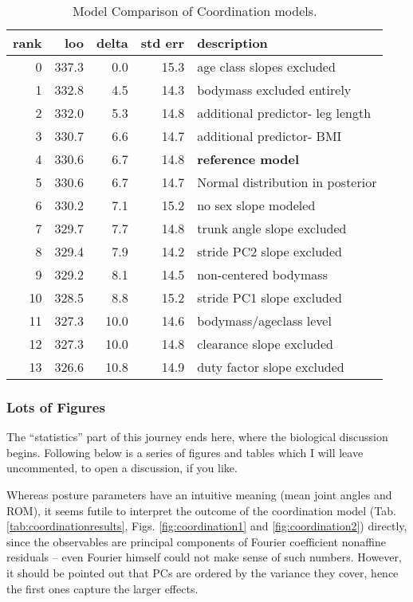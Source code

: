 \begin{table}[htbp]
\caption{\label{tab:coordinationmodelcomparison}Model Comparison of Coordination models.}
\centering
\begin{tabular}{rrrrl}
\textbf{rank} & \textbf{loo} & \textbf{delta} & \textbf{std err} & \textbf{description}\\[0pt]
\hline
0 & 337.3 & 0.0 & 15.3 & age class slopes excluded\\[0pt]
1 & 332.8 & 4.5 & 14.3 & bodymass excluded entirely\\[0pt]
2 & 332.0 & 5.3 & 14.8 & additional predictor- leg length\\[0pt]
3 & 330.7 & 6.6 & 14.7 & additional predictor- BMI\\[0pt]
4 & 330.6 & 6.7 & 14.8 & \textbf{reference model}\\[0pt]
5 & 330.6 & 6.7 & 14.7 & Normal distribution in posterior\\[0pt]
6 & 330.2 & 7.1 & 15.2 & no sex slope modeled\\[0pt]
7 & 329.7 & 7.7 & 14.8 & trunk angle slope excluded\\[0pt]
8 & 329.4 & 7.9 & 14.2 & stride PC2 slope excluded\\[0pt]
9 & 329.2 & 8.1 & 14.5 & non-centered bodymass\\[0pt]
10 & 328.5 & 8.8 & 15.2 & stride PC1 slope excluded\\[0pt]
11 & 327.3 & 10.0 & 14.6 & bodymass/ageclass level\\[0pt]
12 & 327.3 & 10.0 & 14.8 & clearance slope excluded\\[0pt]
13 & 326.6 & 10.8 & 14.9 & duty factor slope excluded\\[0pt]
\end{tabular}
\end{table}


\clearpage
\subsubsection{Lots of Figures}
\label{sec:org00d6433}
The ``statistics'' part of this journey ends here, where the biological discussion begins.
Following below is a series of figures and tables which I will leave uncommented, to open a discussion, if you like.

Whereas posture parameters have an intuitive meaning (mean joint angles and ROM), it seems futile to interpret the outcome of the coordination model (Tab. \ref{tab:coordinationresults}, Figs. \ref{fig:coordination1} and \ref{fig:coordination2}) directly, since the observables are principal components of Fourier coefficient nonaffine residuals -- even Fourier himself could not make sense of such numbers.
However, it should be pointed out that PCs are ordered by the variance they cover, hence the first ones capture the larger effects.

